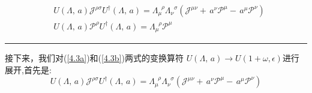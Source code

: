         \begin{subequations}\label{4.3}
        \begin{align}
        &{U}(\Lambda,\,a)\mathscr{J}^{\rho\sigma}{U}^\dagger(\Lambda,\,a)
        =
        \Lambda_\mu^{\;\;\rho}\Lambda^{\;\;\sigma}_\nu
        \left(
        \mathscr{J}^{\mu\nu}
        +\,a^\nu\mathscr{P}^\mu
        -\,a^\mu\mathscr{P}^\nu
        \right)
        \label{4.3a}
        \\
        &{U}(\Lambda,\,a)\mathscr{P}^\rho{U}^\dagger(\Lambda,\,a)
        =
        \Lambda^{\;\;\rho}_\mu\mathscr{P}^\mu
        \label{4.3b}
    \end{align}
\end{subequations}
\hrule
\vspace{2ex}
接下来，我们对(\ref{4.3a})和(\ref{4.3b})两式的变换算符 \({U}(\Lambda,\,a)\rightarrow {U}(1+\omega,\epsilon)\)进行展开,首先是:
\[  {U}(\Lambda,\,a)\mathscr{J}^{\rho\sigma}{U}^\dagger(\Lambda,\,a)=
        \Lambda_\mu^{\;\;\rho}\Lambda^{\;\;\sigma}_\nu
        \left(
        \mathscr{J}^{\mu\nu}
        +\,a^\nu\mathscr{P}^\mu
        -\,a^\mu\mathscr{P}^\nu
        \right)\]

